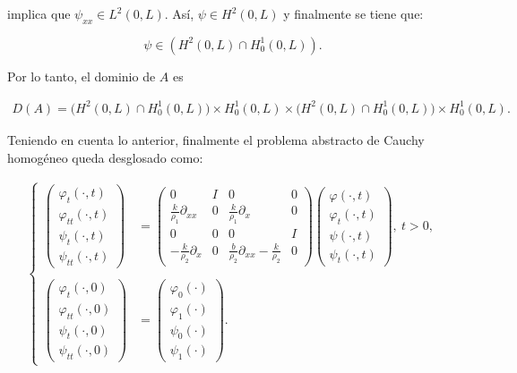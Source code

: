 implica que $\psi_{xx} \in L^2(0,L)$. Así, $\psi \in H^2(0,L)$ y finalmente se tiene que:

\[\psi \in \left(H^2(0,L) \cap H_0^1(0,L) \right).\]

Por lo tanto, el dominio de $A$ es

\begin{align}
    \label{DomOperadorATimoBasico}
    D(A) = \Big(H^2(0,L) \cap H_0^1(0,L) \Big) \times H_0^1(0,L) \times \Big(H^2(0,L) \cap H_0^1(0,L) \Big) \times H_0^1(0,L).
\end{align}

Teniendo en cuenta lo anterior, finalmente el problema abstracto de Cauchy homogéneo queda desglosado como:

\begin{align}
    \label{probCauchyHomTimoBasicoDesglosado}
    \begin{cases}
        \begin{pmatrix}
            \varphi_{t}(\cdot, t)\\
            \varphi_{tt}(\cdot, t)\\
            \psi_{t}(\cdot, t)\\
            \psi_{tt}(\cdot, t)
        \end{pmatrix} &= 
        \begin{pmatrix}
        0 & I & 0 & 0\\
        \frac{k}{\rho_1}\partial_{xx} & 0 & \frac{k}{\rho_1}\partial_x & 0\\
        0 & 0 & 0 & I\\
        -\frac{k}{\rho_2}\partial_x & 0 & \frac{b}{\rho_2}\partial_{xx} - \frac{k}{\rho_2} & 0
        \end{pmatrix}
        \begin{pmatrix}
            \varphi(\cdot, t)\\
            \varphi_{t}(\cdot, t)\\
            \psi(\cdot, t)\\
            \psi_{t}(\cdot, t)
        \end{pmatrix}, \ t > 0,\\ \\
        \begin{pmatrix}
            \varphi_{t}(\cdot, 0)\\
            \varphi_{tt}(\cdot, 0)\\
            \psi_{t}(\cdot, 0)\\
            \psi_{tt}(\cdot, 0)
        \end{pmatrix} &=
        \begin{pmatrix}
            \varphi_0(\cdot)\\
            \varphi_1(\cdot)\\
            \psi_0(\cdot)\\
            \psi_1(\cdot)
        \end{pmatrix}.
    \end{cases}
\end{align}

